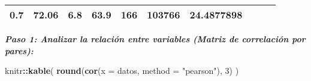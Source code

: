 \documentclass[]{article}
\newenvironment{Shaded}{\begin{snugshade}}{\end{snugshade}}
\newcommand{\KeywordTok}[1]{\textcolor[rgb]{0.13,0.29,0.53}{\textbf{#1}}}
\newcommand{\DataTypeTok}[1]{\textcolor[rgb]{0.13,0.29,0.53}{#1}}
\newcommand{\DecValTok}[1]{\textcolor[rgb]{0.00,0.00,0.81}{#1}}
\newcommand{\StringTok}[1]{\textcolor[rgb]{0.31,0.60,0.02}{#1}}
\newcommand{\OperatorTok}[1]{\textcolor[rgb]{0.81,0.36,0.00}{\textbf{#1}}}
\newcommand{\NormalTok}[1]{#1}
\begin{document}
\begin{longtable}[]{@{}lrrrrrrrrr@{}}
\begin{minipage}[t]{0.10\columnwidth}
0.7\strut
\end{minipage} & \begin{minipage}[t]{0.07\columnwidth}\raggedleft\strut
72.06\strut
\end{minipage} & \begin{minipage}[t]{0.05\columnwidth}\raggedleft\strut
6.8\strut
\end{minipage} & \begin{minipage}[t]{0.07\columnwidth}\raggedleft\strut
63.9\strut
\end{minipage} & \begin{minipage}[t]{0.06\columnwidth}\raggedleft\strut
166\strut
\end{minipage} & \begin{minipage}[t]{0.05\columnwidth}\raggedleft\strut
103766\strut
\end{minipage} & \begin{minipage}[t]{0.10\columnwidth}\raggedleft\strut
24.4877898\strut
\end{minipage}\tabularnewline
\bottomrule
\end{longtable}

\emph{\textbf{Paso 1: Analizar la relación entre variables (Matriz de
correlación por pares):}}

\begin{Shaded}
\begin{Highlighting}[]
\NormalTok{knitr}\OperatorTok{::}\KeywordTok{kable}\NormalTok{(}
\KeywordTok{round}\NormalTok{(}\KeywordTok{cor}\NormalTok{(}\DataTypeTok{x =}\NormalTok{ datos, }\DataTypeTok{method =} \StringTok{"pearson"}\NormalTok{), }\DecValTok{3}\NormalTok{)}
\NormalTok{)}
\end{Highlighting}
\end{Shaded}
\end{document}
